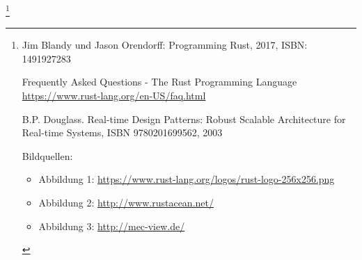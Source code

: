 \def\footnoterule{} 
\let\thefootnote\relax\footnote{ 
	{ 
		\hspace{8.013cm}\vspace{0.1mm} 
		\begin{minipage}[t]{.5\linewidth}
			
\begin{list}{\textcolor{black}{[]}}{\setlength{\labelwidth}{2cm}\setlength{\leftmargin}{0.5cm}\setlength{\itemsep}{-1mm}}
	\item Jim Blandy und Jason Orendorff: Programming Rust, 2017, ISBN: 1491927283
	\item Frequently Asked Questions - The Rust Programming Language \url{https://www.rust-lang.org/en-US/faq.html}
	\item B.P. Douglass. Real-time Design Patterns: Robust Scalable Architecture for
	Real-time Systems, ISBN 9780201699562, 2003
\end{list}
Bildquellen:
\begin{itemize}
	\item Abbildung 1: \url{https://www.rust-lang.org/logos/rust-logo-256x256.png}
	\item Abbildung 2: \url{http://www.rustacean.net/}
	\item Abbildung 3: \url{http://mec-view.de/}
\end{itemize}

\end{minipage} 
}} 

\newpage

